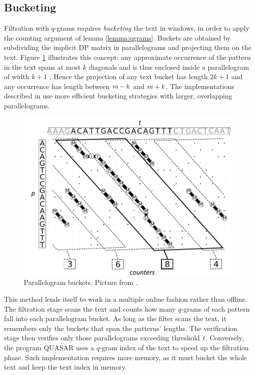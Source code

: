 \subsection{Bucketing}

Filtration with $q$-grams requires \emph{bucketing} the text in windows, in order to apply the counting argument of lemma \ref{lemma:qgrams}.
Buckets are obtained by subdividing the implicit DP matrix in parallelograms and projecting them on the text.
Figure \ref{fig:swift} illustrates this concept: any approximate occurrence of the pattern in the text spans at most $k$ diagonals and is thus enclosed inside a parallelogram of width $k+1$ \citep{Rasmussen2006}.
Hence the projection of any text bucket has length $2k + 1$ and any occurrence has length between $m - k$ and $m + k$.
The implementations described in \citep{Rasmussen2006, Kehr2011, Weese2009} use more efficient bucketing strategies with larger, overlapping parallelograms.

\begin{figure}[h]
\begin{center}
\caption[Parallelogram buckets] {Parallelogram buckets. Picture from \citep{Weese2009}.}
\label{fig:swift}
\includegraphics[scale=0.75]{figures/swift.pdf}
\end{center}
\end{figure}

This method lends itself to work in a multiple online fashion rather than offline.
The filtration stage scans the text and counts how many $q$-grams of each pattern fall into each parallelogram bucket.
As long as the filter scans the text, it remembers only the buckets that span the patterns' lengths.
The verification stage then verifies only those parallelograms exceeding threshold $t$.
Conversely, the program QUASAR \citep{Burkhardt1999} uses a $q$-gram index of the text to speed up the filtration phase.
Such implementation requires more memory, as it must bucket the whole text and keep the text index in memory.

